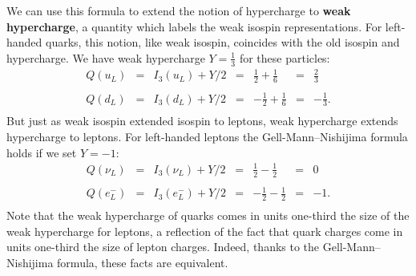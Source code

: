 \documentclass[12pt]{article}
\newcommand{\half}{\frac{1}{2}} %
\newcommand{\third}{\frac{1}{3}} %
\newcommand{\twothirds}{\frac{2}{3}} %
\begin{document}
We can use this formula to extend the notion of hypercharge to \textbf{weak
hypercharge}, a quantity which labels the weak isospin representations. For
left-handed quarks, this notion, like weak isospin, coincides with the old
isospin and hypercharge.  We have weak hypercharge $Y = \third$ for these
particles:
\[ \begin{array}{ccccrcr}
	Q(u_L) &=& I_3(u_L) + Y/2 & = & \half + \frac{1}{6}  &=& \twothirds \\
                                                                           \\ 
	Q(d_L) &=& I_3(d_L) + Y/2 & = & -\half + \frac{1}{6}& =& -\third .  \\
\end{array}
\]
But just as weak isospin extended isospin to leptons, weak hypercharge extends
hypercharge to leptons. For left-handed leptons the
Gell-Mann--Nishijima formula holds if we set $Y = -1$:
\[ \begin{array}{ccccrcr}
	Q(\nu_L) &=& I_3(\nu_L) + Y/2 & = & \half - \half  &=& 0 \\
                                                                    \\
	Q(e^-_L) &=& I_3(e^-_L) + Y/2 & = & -\half - \half &=& -1 .  \\
\end{array}
\]
Note that the weak hypercharge of quarks comes in units one-third the size of
the weak hypercharge for leptons, a reflection of the fact that quark charges
come in units one-third the size of lepton charges. Indeed, thanks to the
Gell-Mann--Nishijima formula, these facts are equivalent.
\end{document}
